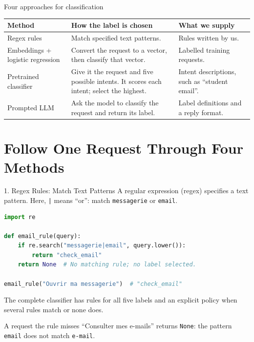 \documentclass[aspectratio=169]{beamer}
\begin{document}
\begin{frame}{Four approaches for classification}
  \small\renewcommand{\arraystretch}{1.2}
  \begin{tabular}{@{}>{\raggedright\arraybackslash}p{3.2cm}>{\raggedright\arraybackslash}p{5.2cm}>{\raggedright\arraybackslash}p{3.9cm}@{}}
    \toprule
    \textbf{Method} & \textbf{How the label is chosen} & \textbf{What we supply} \\
    \midrule
    Regex rules & Match specified text patterns. & Rules written by us. \\
    Embeddings + logistic regression & Convert the request to a vector, then classify that vector. & Labelled training requests. \\
    Pretrained classifier & Give it the request and five possible intents. It scores each intent; select the highest. & Intent descriptions, such as ``student email''. \\
    Prompted LLM & Ask the model to classify the request and return its label. & Label definitions and a reply format. \\
    \bottomrule
  \end{tabular}
\end{frame}

\section{Follow One Request Through Four Methods}

\begin{frame}[fragile]{1. Regex Rules: Match Text Patterns}
  \small A regular expression (regex) specifies a text pattern. Here, \texttt{|} means ``or'': match \texttt{messagerie} or \texttt{email}.
\begin{lstlisting}[language=Python]
import re

def email_rule(query):
    if re.search("messagerie|email", query.lower()):
        return "check_email"
    return None  # No matching rule; no label selected.

email_rule("Ouvrir ma messagerie")  # "check_email"
\end{lstlisting}
  \small The complete classifier has rules for all five labels and an explicit policy when several rules match or none does.
  \begin{block}{A request the rule misses}
    ``Consulter mes e-mails'' returns \texttt{None}: the pattern \texttt{email} does not match \texttt{e-mail}.
  \end{block}
\end{frame}
\end{document}
